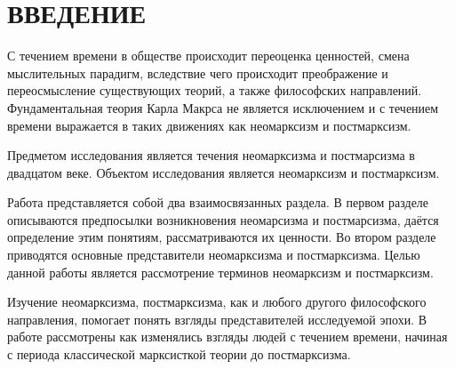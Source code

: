 \section*{ВВЕДЕНИЕ}

С течением времени в обществе происходит переоценка ценностей,
смена мыслительных парадигм, вследствие чего происходит
преображение и переосмысление существующих теорий, а также философских направлений.
Фундаментальная теория Карла Макрса не является исключением и с течением времени
выражается в таких движениях как неомарксизм и постмарксизм.

Предметом исследования является течения неомарксизма и постмарсизма в двадцатом
веке. Объектом исследования является неомарксизм и постмарксизм.

Работа представляется собой два взаимосвязанных раздела.
В первом разделе описываются предпосылки возникновения неомарсизма и постмарсизма,
даётся определение этим понятиям, рассматриваются их ценности.
Во втором разделе приводятся основные представители неомарксизма и постмарксизма.
Целью данной работы является рассмотрение терминов неомарксизм и постмарксизм.

Изучение неомарксизма, постмарксизма, как и любого другого философского направления,
помогает понять взгляды представителей исследуемой эпохи. В работе рассмотрены
как изменялись взгляды людей с течением времени, начиная с периода классической
марксисткой теории до постмарксизма.

